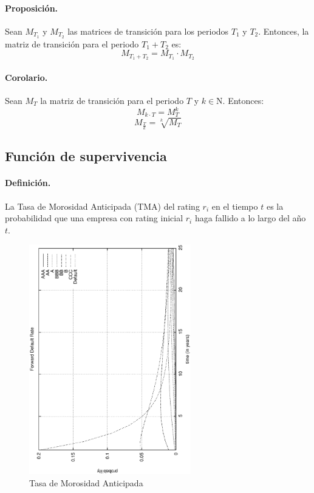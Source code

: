 \paragraph{Proposici\'on.} Sean $M_{T_1}$ y $M_{T_2}$ las matrices de transici\'on
para los periodos $T_1$ y $T_2$. Entonces, la matriz de transici\'on para el
periodo $T_1+T_2$ es:
\begin{displaymath}
M_{T_1+T_2} = M_{T_1} \cdot M_{T_2}
\end{displaymath}

\paragraph{Corolario.} Sean $M_{T}$ la matriz de transici\'on para el periodo 
$T$ y $k \in \mathrm{N}$. Entonces:
\begin{displaymath}
M_{k \cdot T} = M_{T}^k
\end{displaymath}
\begin{displaymath}
M_{\frac{T}{k}} = \sqrt[k]{M_{T}}
\end{displaymath}


\subsection{Funci\'on de supervivencia}

\paragraph{Definici\'on.} La Tasa de Morosidad Anticipada (TMA) 
del rating $r_i$ en el tiempo $t$ es la probabilidad que una empresa con rating 
inicial $r_i$ haga fallido a lo largo del a\~no $t$.

\begin{figure}[!hb]
\begin{center}
\includegraphics[height=10cm, angle=-90]{./images/tma.ps}
\caption{Tasa de Morosidad Anticipada}
\label{tma}
\end{center}
\end{figure}

